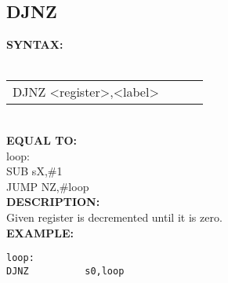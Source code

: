 {                \subsection{DJNZ}
                \textbf{SYNTAX:}\\
                \\ {
                    \texttt{}
                    \begin{tabular}[h!]{llll}
                            { \color{highlight_instruction} DJNZ    } { \color{highlight_symbol} <register>,<label> }
                            { \color{highlight_comment}  }\\
                    \end{tabular}
                    }\\
                    \textbf{EQUAL TO:}\\
                    { \color{highlight_label} loop:    } { \color{highlight_symbol}       }\\
                    { \color{highlight_instruction} SUB    } { \color{highlight_symbol}      sX,\#1 }\\
                    { \color{highlight_instruction} JUMP    } { \color{highlight_symbol}     NZ,\#loop }\\
                \textbf{DESCRIPTION:}\\
                Given register is decremented until it is zero.\\
                \textbf{EXAMPLE:}\\
                        \begin{code}[h!]
                        {\color{highlight_symbol}\verb'loop:          ' }\\
                        {\color{highlight_symbol}\verb'DJNZ          s0,loop' }\\
                        \end{code}

}
